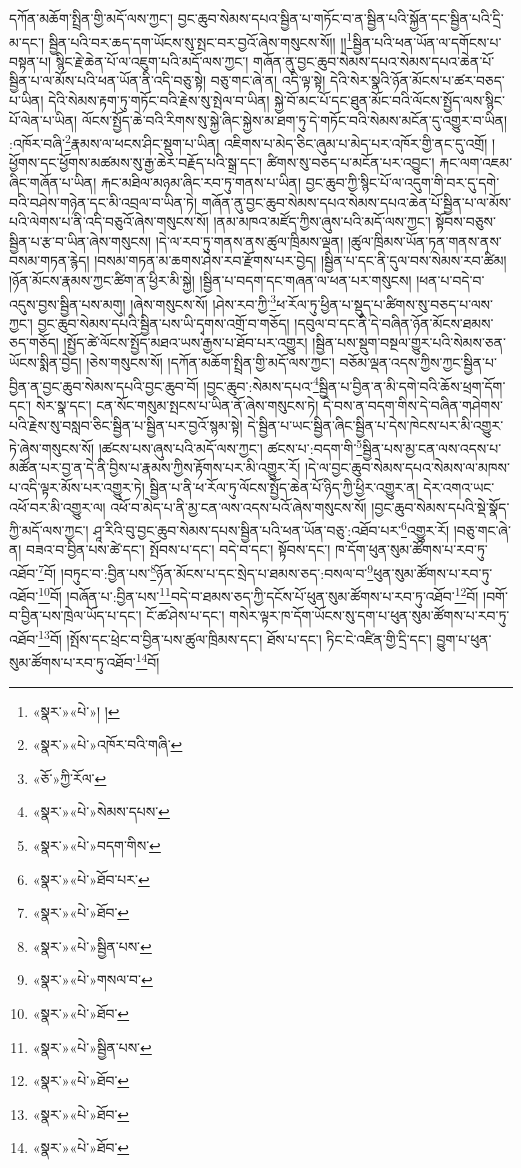 དཀོན་མཆོག་སྤྲིན་གྱི་མདོ་ལས་ཀྱང་། བྱང་ཆུབ་སེམས་དཔའ་སྦྱིན་པ་གཏོང་བ་ན་སྦྱིན་པའི་སྐྱོན་དང་སྦྱིན་པའི་དྲི་མ་དང་། སྦྱིན་པའི་བར་ཆད་དག་ཡོངས་སུ་སྤང་བར་བྱའོ་ཞེས་གསུངས་སོ།། །།\footnote{«སྣར་»«པེ་»། །}སྦྱིན་པའི་ཕན་ཡོན་ལ་དགོངས་པ་བསྟན་པ། སྙིང་རྗེ་ཆེན་པོ་ལ་འཇུག་པའི་མདོ་ལས་ཀྱང་། གཞོན་ནུ་བྱང་ཆུབ་སེམས་དཔའ་སེམས་དཔའ་ཆེན་པོ་སྦྱིན་པ་ལ་མོས་པའི་ཕན་ཡོན་ནི་འདི་བཅུ་སྟེ། བཅུ་གང་ཞེ་ན། འདི་ལྟ་སྟེ། དེའི་སེར་སྣའི་ཉོན་མོངས་པ་ཚར་བཅད་པ་ཡིན། དེའི་སེམས་རྟག་ཏུ་གཏོང་བའི་རྗེས་སུ་སྤེལ་བ་ཡིན། སྐྱེ་བོ་མང་པོ་དང་ཐུན་མོང་བའི་ལོངས་སྤྱོད་ལས་སྙིང་པོ་ལེན་པ་ཡིན། ལོངས་སྤྱོད་ཆེ་བའི་རིགས་སུ་སྐྱེ་ཞིང་སྐྱེས་མ་ཐག་ཏུ་དེ་གཏོང་བའི་སེམས་མངོན་དུ་འགྱུར་བ་ཡིན། :འཁོར་བཞི་\footnote{«སྣར་»«པེ་»འཁོར་བའི་གཞི་}རྣམས་ལ་ཕངས་ཤིང་སྡུག་པ་ཡིན། འཇིགས་པ་མེད་ཅིང་ཞུམ་པ་མེད་པར་འཁོར་གྱི་ནང་དུ་འགྲོ། །ཕྱོགས་དང་ཕྱོགས་མཚམས་སུ་རྒྱ་ཆེར་བརྗོད་པའི་སྒྲ་དང་། ཚིགས་སུ་བཅད་པ་མངོན་པར་འབྱུང་། རྐང་ལག་འཇམ་ཞིང་གཞོན་པ་ཡིན། རྐང་མཐིལ་མཉམ་ཞིང་རབ་ཏུ་གནས་པ་ཡིན། བྱང་ཆུབ་ཀྱི་སྙིང་པོ་ལ་འདུག་གི་བར་དུ་དགེ་བའི་བཤེས་གཉེན་དང་མི་འབྲལ་བ་ཡིན་ཏེ། གཞོན་ནུ་བྱང་ཆུབ་སེམས་དཔའ་སེམས་དཔའ་ཆེན་པོ་སྦྱིན་པ་ལ་མོས་པའི་ལེགས་པ་ནི་འདི་བཅུའོ་ཞེས་གསུངས་སོ། །ནམ་མཁའ་མཛོད་ཀྱིས་ཞུས་པའི་མདོ་ལས་ཀྱང་། སྟོབས་བཅུས་སྦྱིན་པ་རྩ་བ་ཡིན་ཞེས་གསུངས། །དེ་ལ་རབ་ཏུ་གནས་ནས་ཚུལ་ཁྲིམས་ལྡན། །ཚུལ་ཁྲིམས་ཡོན་ཏན་གནས་ནས་བསམ་གཏན་རྙེད། །བསམ་གཏན་མ་ཆགས་ཤེས་རབ་རྫོགས་པར་བྱེད། །སྦྱིན་པ་དང་ནི་དུལ་བས་སེམས་རབ་ཚིམ། །ཉོན་མོངས་རྣམས་ཀྱང་ཚིག་ན་ཕྱིར་མི་སྐྱེ། །སྦྱིན་པ་བདག་དང་གཞན་ལ་ཕན་པར་གསུངས། །ཕན་པ་བདེ་བ་འདུས་བྱས་སྦྱིན་པས་མགུ། །ཞེས་གསུངས་སོ། །ཤེས་རབ་ཀྱི་\footnote{«ཅོ་»ཀྱི་རོལ་}ཕ་རོལ་ཏུ་ཕྱིན་པ་སྡུད་པ་ཚིགས་སུ་བཅད་པ་ལས་ཀྱང་། བྱང་ཆུབ་སེམས་དཔའི་སྦྱིན་པས་ཡི་དྭགས་འགྲོ་བ་གཅོད། །དབུལ་བ་དང་ནི་དེ་བཞིན་ཉོན་མོངས་ཐམས་ཅད་གཅོད། །སྤྱོད་ཚེ་ལོངས་སྤྱོད་མཐའ་ཡས་རྒྱས་པ་ཐོབ་པར་འགྱུར། །སྦྱིན་པས་སྡུག་བསྔལ་གྱུར་པའི་སེམས་ཅན་ཡོངས་སྨིན་བྱེད། །ཅེས་གསུངས་སོ། །དཀོན་མཆོག་སྤྲིན་གྱི་མདོ་ལས་ཀྱང་། བཅོམ་ལྡན་འདས་ཀྱིས་ཀྱང་སྦྱིན་པ་བྱིན་ན་བྱང་ཆུབ་སེམས་དཔའི་བྱང་ཆུབ་བོ། །བྱང་ཆུབ་:སེམས་དཔའ་\footnote{«སྣར་»«པེ་»སེམས་དཔས་}སྦྱིན་པ་བྱིན་ན་མི་དགེ་བའི་ཆོས་ཕྲག་དོག་དང་། སེར་སྣ་དང་། ངན་སོང་གསུམ་སྤངས་པ་ཡིན་ནོ་ཞེས་གསུངས་ཏེ། དེ་བས་ན་བདག་གིས་དེ་བཞིན་གཤེགས་པའི་རྗེས་སུ་བསླབ་ཅིང་སྦྱིན་པ་སྦྱིན་པར་བྱའོ་སྙམ་སྟེ། དེ་སྦྱིན་པ་ཡང་སྦྱིན་ཞིང་སྦྱིན་པ་དེས་ཁེངས་པར་མི་འགྱུར་ཏེ་ཞེས་གསུངས་སོ། །ཚངས་པས་ཞུས་པའི་མདོ་ལས་ཀྱང་། ཚངས་པ་:བདག་གི་\footnote{«སྣར་»«པེ་»བདག་གིས་}སྦྱིན་པས་མྱ་ངན་ལས་འདས་པ་མཚོན་པར་བྱ་ན་དེ་ནི་བྱིས་པ་རྣམས་ཀྱིས་རྟོགས་པར་མི་འགྱུར་རོ། །དེ་ལ་བྱང་ཆུབ་སེམས་དཔའ་སེམས་ལ་མཁས་པ་འདི་ལྟར་མོས་པར་འགྱུར་ཏེ། སྦྱིན་པ་ནི་ཕ་རོལ་ཏུ་ལོངས་སྤྱོད་ཆེན་པོ་ཉིད་ཀྱི་ཕྱིར་འགྱུར་ན། དེར་འགའ་ཡང་འཕོ་བར་མི་འགྱུར་ལ། འཕོ་བ་མེད་པ་ནི་མྱ་ངན་ལས་འདས་པའོ་ཞེས་གསུངས་སོ། །བྱང་ཆུབ་སེམས་དཔའི་སྡེ་སྣོད་ཀྱི་མདོ་ལས་ཀྱང་། ཤཱ་རིའི་བུ་བྱང་ཆུབ་སེམས་དཔས་སྦྱིན་པའི་ཕན་ཡོན་བཅུ་:འཐོབ་པར་\footnote{«སྣར་»«པེ་»ཐོབ་པར་}འགྱུར་རོ། །བཅུ་གང་ཞེ་ན། བཟའ་བ་བྱིན་པས་ཚེ་དང་། སྤོབས་པ་དང་། བདེ་བ་དང་། སྟོབས་དང་། ཁ་དོག་ཕུན་སུམ་ཚོགས་པ་རབ་ཏུ་འཐོབ་\footnote{«སྣར་»«པེ་»ཐོབ་}བོ། །བཏུང་བ་:བྱིན་པས་\footnote{«སྣར་»«པེ་»སྦྱིན་པས་}ཉོན་མོངས་པ་དང་སྲེད་པ་ཐམས་ཅད་:བསལ་བ་\footnote{«སྣར་»«པེ་»གསལ་བ་}ཕུན་སུམ་ཚོགས་པ་རབ་ཏུ་འཐོབ་\footnote{«སྣར་»«པེ་»ཐོབ་}བོ། །བཞོན་པ་:བྱིན་པས་\footnote{«སྣར་»«པེ་»སྦྱིན་པས་}བདེ་བ་ཐམས་ཅད་ཀྱི་དངོས་པོ་ཕུན་སུམ་ཚོགས་པ་རབ་ཏུ་འཐོབ་\footnote{«སྣར་»«པེ་»ཐོབ་}བོ། །བགོ་བ་བྱིན་པས་ཁྲེལ་ཡོད་པ་དང་། ངོ་ཚ་ཤེས་པ་དང་། གསེར་ལྟར་ཁ་དོག་ཡོངས་སུ་དག་པ་ཕུན་སུམ་ཚོགས་པ་རབ་ཏུ་འཐོབ་\footnote{«སྣར་»«པེ་»ཐོབ་}བོ། །སྤོས་དང་ཕྲེང་བ་བྱིན་པས་ཚུལ་ཁྲིམས་དང་། ཐོས་པ་དང་། ཏིང་ངེ་འཛིན་གྱི་དྲི་དང་། བྱུག་པ་ཕུན་སུམ་ཚོགས་པ་རབ་ཏུ་འཐོབ་\footnote{«སྣར་»«པེ་»ཐོབ་}བོ། 